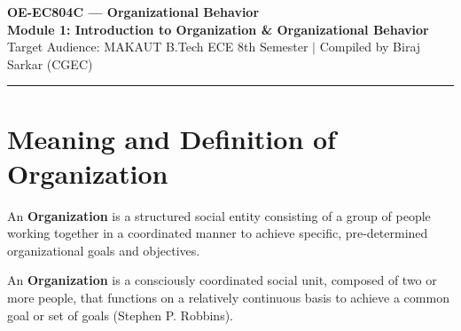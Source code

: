 \documentclass[11pt,a4paper]{article}
\begin{document}
\begin{center}
  {\LARGE \bfseries \color{myred} OE-EC804C --- Organizational Behavior}\\[6pt]
  {\Large \bfseries \color{myteal} Module 1: Introduction to Organization \& Organizational Behavior}\\[4pt]
  {\small \color{mydark} Target Audience: MAKAUT B.Tech ECE 8th Semester $|$ Compiled by Biraj Sarkar (CGEC)}
\end{center}
\vspace{-6pt}
\hrule
\vspace{10pt}

\begin{tcolorbox}[tikzbox, title={Module Contents}]
\small
\tableofcontents
\end{tcolorbox}
\vspace{10pt}

\section{Meaning and Definition of Organization}

An \textbf{Organization} is a structured social entity consisting of a group of people working together in a coordinated manner to achieve specific, pre-determined organizational goals and objectives.

\begin{tcolorbox}[defbox, title={Definition of Organization}]
  An \textbf{Organization} is a consciously coordinated social unit, composed of two or more people, that functions on a relatively continuous basis to achieve a common goal or set of goals (Stephen P. Robbins).
\end{tcolorbox}
\end{document}
